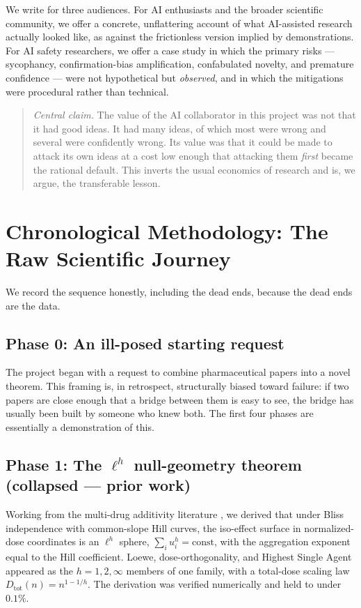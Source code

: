\documentclass[11pt]{article}
\theoremstyle{remark}
\begin{document}
We write for three audiences. For AI enthusiasts and the broader scientific community, we offer a concrete, unflattering account of what AI-assisted research actually looked like, as against the frictionless version implied by demonstrations. For AI safety researchers, we offer a case study in which the primary risks --- sycophancy, confirmation-bias amplification, confabulated novelty, and premature confidence --- were not hypothetical but \emph{observed}, and in which the mitigations were procedural rather than technical.

\begin{quote}
\emph{Central claim.} The value of the AI collaborator in this project was not that it had good ideas. It had many ideas, of which most were wrong and several were confidently wrong. Its value was that it could be made to attack its own ideas at a cost low enough that attacking them \emph{first} became the rational default. This inverts the usual economics of research and is, we argue, the transferable lesson.
\end{quote}

\section{Chronological Methodology: The Raw Scientific Journey}
\label{sec:history}

We record the sequence honestly, including the dead ends, because the dead ends are the data.

\subsection{Phase 0: An ill-posed starting request}
The project began with a request to combine pharmaceutical papers into a novel theorem. This framing is, in retrospect, structurally biased toward failure: if two papers are close enough that a bridge between them is easy to see, the bridge has usually been built by someone who knew both. The first four phases are essentially a demonstration of this.

\subsection{Phase 1: The $\ell^h$ null-geometry theorem (collapsed --- prior work)}
Working from the multi-drug additivity literature \citep{russ2018}, we derived that under Bliss independence with common-slope Hill curves, the iso-effect surface in normalized-dose coordinates is an $\ell^h$ sphere, $\sum_i u_i^h = \text{const}$, with the aggregation exponent equal to the Hill coefficient. Loewe, dose-orthogonality, and Highest Single Agent appeared as the $h=1,2,\infty$ members of one family, with a total-dose scaling law $D_{\text{tot}}(n)=n^{1-1/h}$. The derivation was verified numerically and held to under $0.1\%$.
\end{document}
